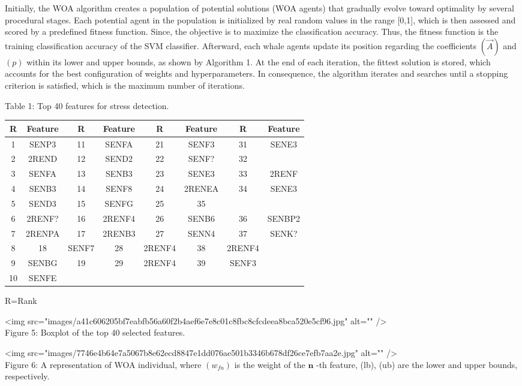 \documentclass{article}
\begin{document}
Initially, the WOA algorithm creates a population of potential solutions (WOA agents) that gradually evolve toward optimality by several procedural stages. Each potential agent in the population is initialized by real random values in the range [0,1], which is then assessed and scored by a predefined fitness function. Since, the objective is to maximize the classification accuracy. Thus, the fitness function is the training classification accuracy of the SVM classifier. Afterward, each whale agents update its position regarding the coefficients $(\vec{A})$ and $(p)$ within its lower and upper bounds, as shown by Algorithm 1. At the end of each iteration, the fittest solution is stored, which accounts for the best configuration of weights and hyperparameters. In consequence, the algorithm iterates and searches until a stopping criterion is satisfied, which is the maximum number of iterations.

Table 1: Top 40 features for stress detection.

\begin{tabular}{|c|c|c|c|c|c|c|c|}\hline
R & Feature & R & Feature & R & Feature & R & Feature \\ \hline
1 & SENP3 & 11 & SENFA & 21 & SENF3 & 31 & SENE3 \\ \hline
2 & 2REND & 12 & SEND2 & 22 & SENF? & 32 &  \\ \hline
3 & SENFA & 13 & SENB3 & 23 & SENE3 & 33 & 2RENF \\ \hline
4 & SENB3 & 14 & SENF8 & 24 & 2RENEA & 34 & SENE3 \\ \hline
5 & SEND3 & 15 & SENFG & 25 & 35 &  &  \\ \hline
6 & 2RENF? & 16 & 2RENF4 & 26 & SENB6 & 36 & SENBP2 \\ \hline
7 & 2RENPA & 17 & 2RENB3 & 27 & SENN4 & 37 & SENK? \\ \hline
8 & 18 & SENF7 & 28 & 2RENF4 & 38 & 2RENF4 &  \\ \hline
9 & SENBG & 19 & 29 & 2RENF4 & 39 & SENF3 &  \\ \hline
10 & SENFE &  &  &  &  &  &  \\ \hline
\end{tabular}

R=Rank

<img src="images/a41c606205bf7eabfb56a60f2b4aef6e7e8c01c8fbc8cfcdeea8bca520e5cf96.jpg" alt="" />\\
Figure 5: Boxplot of the top 40 selected features.

<img src="images/7746e4b64e7a5067b8e62ecd8847e1dd076ae501b3346b678df26ce7efb7aa2e.jpg" alt="" />\\
Figure 6: A representation of WOA individual, where $(w_{f n})$ is the weight of the $\mathbf{n}$ -th feature, (lb), (ub) are the lower and upper bounds, respectively.
\end{document}
